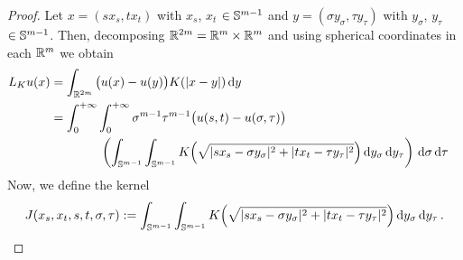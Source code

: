 \begin{proof}
%
%	
Let $x = (s x_s, t x_t)$ with $x_s$, $x_t$ $\in \mathbb{S}^{m-1}$ and $y = (\sigma y_\sigma, \tau
y_\tau)$ with $y_\sigma$, $y_\tau$ $\in \mathbb{S}^{m-1}$. Then, decomposing $\mathbb{R}^{2m} = \mathbb{R}^m \times \mathbb{R}^m$
and using spherical coordinates in each $\mathbb{R}^m$ we obtain
\begin{align*}
L_Ku(x) &= \int_{\mathbb{R}^{2m}} \big( u(x) - u(y)\big) K( |x-y|) \,\mathrm{d} y &\\
&= \int_0^{+\infty}  \int_0^{+\infty} \sigma^{m-1} \tau^{m-1} \big(u(s,t) - u(\sigma, \tau)\big)  \\
&\quad \quad \quad \quad  \left ( {\int_{\mathbb{S}^{m-1}}  \int_{\mathbb{S}^{m-1}} K \Big( \sqrt{|sx_s - \sigma y_\sigma|^2 + |t x_t - \tau y_\tau|^2 } \Big) \,\mathrm{d} y_\sigma \,\mathrm{d} y_\tau }\right ) \,\mathrm{d} \sigma \,\mathrm{d} \tau
\end{align*}
Now, we define the kernel
\begin{equation}
\label{Eq:KernelSTVariablesProof1}
J(x_s, x_t, s,t,\sigma, \tau) := \int_{\mathbb{S}^{m-1}}  \int_{\mathbb{S}^{m-1}} K \Big( \sqrt{|sx_s - \sigma y_\sigma|^2 + |t x_t - \tau y_\tau|^2 }\Big ) \,\mathrm{d} y_\sigma \,\mathrm{d} y_\tau \,.
\end{equation}


\end{proof}
